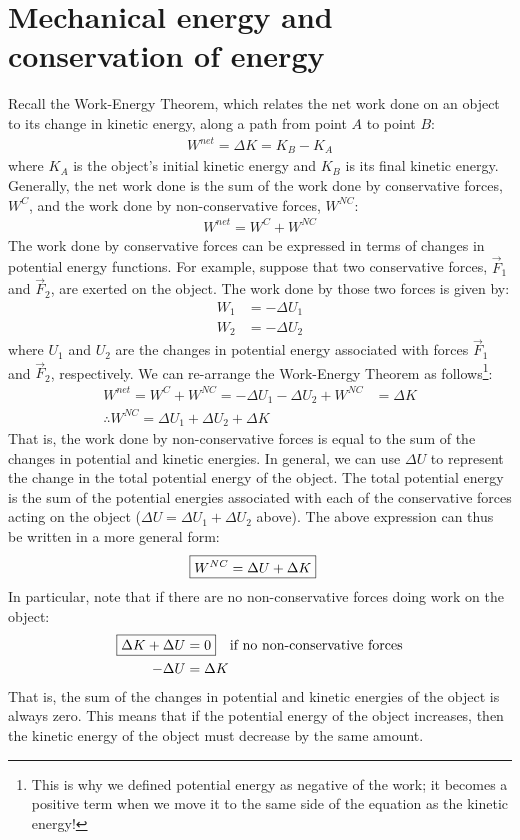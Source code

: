 \section{Mechanical energy and conservation of energy}
Recall the Work-Energy Theorem, which relates the net work done on an object to its change in kinetic energy, along a path from point $A$ to point $B$:
\begin{align*}
W^{net}=\Delta K = K_B - K_A
\end{align*}
where $K_A$ is the object's initial kinetic energy and $K_B$ is its final kinetic energy. Generally, the net work done is the sum of the work done by conservative forces, $W^C$, and the work done by non-conservative forces, $W^{NC}$:
\begin{align*}
W^{net}=W^C+W^{NC}
\end{align*}
The work done by conservative forces can be expressed in terms of changes in potential energy functions. For example, suppose that two conservative forces, $\vec F_1$ and $\vec F_2$, are exerted on the object. The work done by those two forces is given by:
\begin{align*}
W_1 &= -\Delta U_1\\
W_2 &= -\Delta U_2
\end{align*}
where $U_1$ and $U_2$ are the changes in potential energy associated with forces $\vec F_1$ and $\vec F_2$, respectively. We can re-arrange the Work-Energy Theorem as follows\footnote{This is why we defined potential energy as negative of the work; it becomes a positive term when we move it to the same side of the equation as the kinetic energy!}:
\begin{align*}
W^{net}=W^C+W^{NC}=-\Delta U_1 - \Delta U_2 +W^{NC} &= \Delta K\\
\therefore W^{NC} = \Delta U_1 + \Delta U_2 + \Delta K
\end{align*}
That is, the work done by non-conservative forces is equal to the sum of the changes in potential and kinetic energies. In general, we can use $\Delta U$ to represent the change in the total potential energy of the object. The total potential energy is the sum of the potential energies associated with each of the conservative forces acting on the object ($\Delta U = \Delta U_1 + \Delta U_2$ above). The above expression can thus be written in a more general form:
\begin{align}
\Aboxed{W^{NC}=\Delta U + \Delta K}
\end{align}
In particular, note that if there are no non-conservative forces doing work on the object:
\begin{align}
\Aboxed{\Delta K + \Delta U &= 0}\quad\text{if no non-conservative forces}\\
-\Delta U &= \Delta K \nonumber
\end{align}
That is, the sum of the changes in potential and kinetic energies of the object is always zero. This means that if the potential energy of the object increases, then the kinetic energy of the object must decrease by the same amount.

